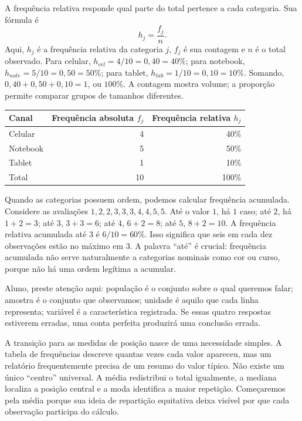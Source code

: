 A frequência relativa responde qual parte do total pertence a cada categoria. Sua fórmula é
\[
 h_j=\frac{f_j}{n}.
\]
Aqui, $h_j$ é a frequência relativa da categoria $j$, $f_j$ é sua contagem e $n$ é o total observado. Para celular, $h_{cel}=4/10=0{,}40=40\%$; para notebook, $h_{note}=5/10=0{,}50=50\%$; para tablet, $h_{tab}=1/10=0{,}10=10\%$. Somando, $0{,}40+0{,}50+0{,}10=1$, ou $100\%$. A contagem mostra volume; a proporção permite comparar grupos de tamanhos diferentes.

\begin{center}
\small
\begin{tabular}{@{}lrr@{}}
\toprule
\textbf{Canal} & \textbf{Frequência absoluta $f_j$} & \textbf{Frequência relativa $h_j$} \\
\midrule
Celular & 4 & 40\% \\
Notebook & 5 & 50\% \\
Tablet & 1 & 10\% \\
\midrule
Total & 10 & 100\% \\
\bottomrule
\end{tabular}
\end{center}

Quando as categorias possuem ordem, podemos calcular frequência acumulada. Considere as avaliações ${1,2,2,3,3,3,4,4,5,5}$. Até o valor $1$, há $1$ caso; até $2$, há $1+2=3$; até $3$, $3+3=6$; até $4$, $6+2=8$; até $5$, $8+2=10$. A frequência relativa acumulada até $3$ é $6/10=60\%$. Isso significa que seis em cada dez observações estão no máximo em $3$. A palavra ``até'' é crucial: frequência acumulada não serve naturalmente a categorias nominais como cor ou curso, porque não há uma ordem legítima a acumular.

\begin{GuidedBox}
Aluno, preste atenção aqui: população é o conjunto sobre o qual queremos falar; amostra é o conjunto que observamos; unidade é aquilo que cada linha representa; variável é a característica registrada. Se essas quatro respostas estiverem erradas, uma conta perfeita produzirá uma conclusão errada.
\end{GuidedBox}

A transição para as medidas de posição nasce de uma necessidade simples. A tabela de frequências descreve quantas vezes cada valor apareceu, mas um relatório frequentemente precisa de um resumo do valor típico. Não existe um único ``centro'' universal. A média redistribui o total igualmente, a mediana localiza a posição central e a moda identifica a maior repetição. Começaremos pela média porque sua ideia de repartição equitativa deixa visível por que cada observação participa do cálculo.

